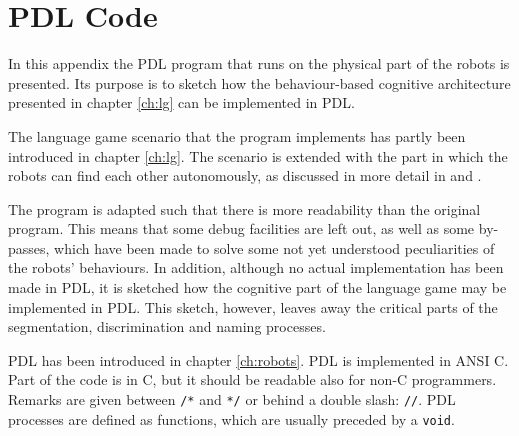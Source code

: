 \chapter{PDL Code}\label{a:pdl}

In this appendix the PDL program that runs on the physical part of the robots is presented. Its purpose is to sketch how the behaviour-based cognitive architecture presented in chapter \ref{ch:lg} can be implemented in PDL.

The language game scenario that the program implements has partly been introduced in chapter \ref{ch:lg}. The scenario is extended with the part in which the robots can find each other autonomously, as discussed in more detail in \citet{steelsvogt:1997} and \citet{vogt:1997}.


The program is adapted such that there is more readability than the original program. This means that some debug facilities are left out, as well as some by-passes, which have been made to solve some not yet understood peculiarities of the robots' behaviours. In addition, although no actual implementation has been made in PDL, it is sketched how the cognitive part of the language game may be implemented in PDL. This sketch, however, leaves away the critical parts of the segmentation, discrimination and naming processes.


PDL has been introduced in chapter \ref{ch:robots}. PDL is implemented in ANSI C. Part of the code is in C, but it should be readable also for non-C programmers. Remarks are given between \texttt{/*} and \texttt{*/} or behind a double slash: \texttt{//}. PDL processes are defined as functions, which are usually preceded by a \texttt{void}.



